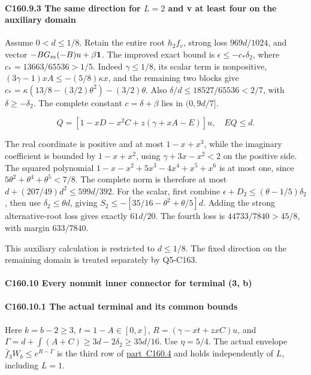 \paragraph{C160.9.3 The same direction for \(L=2\) and v at least four on the auxiliary domain}

Assume \(0<d\le1/8\). Retain the entire root \(h_2f_v\), strong loss \(969d/1024\), and vector \(-BG_m(-B)u+\beta\mathbf1\). The improved exact bound is \(\epsilon\le-c_*\delta_2\), where \(c_*=13663/65536>1/5\). Indeed \(\gamma\le1/8\), its scalar term is nonpositive, \((3\gamma-1)xA\le-(5/8)\kappa x\), and the remaining two blocks give \(c_*=\kappa(13/8-(3/2)\theta^2)-(3/2)\theta\). Also \(\delta/d\le18527/65536<2/7\), with \(\delta\ge-\delta_2\). The complete constant \(c=\delta+\beta\) lies in \((0,\allowbreak \allowbreak  9d/7]\).

\[
Q=[1-xD-x^2C+z(\gamma+xA-E)]u,\quad EQ\le d.
\]

The real coordinate is positive and at most \(1-x+x^3\), while the imaginary coefficient is bounded by \(1-x+x^2\), using \(\gamma+3x-x^2<2\) on the positive side. The squared polynomial \(1-x-x^2+5x^3-4x^4+x^5+x^6\) is at most one, since \(5\theta^2+\theta^4+\theta^5<7/8\). The complete norm is therefore at most \(d+(207/49)d^2\le599d/392\). For the scalar, first combine \(\epsilon+D_2\le(\theta-1/5)\delta_2\), then use \(\delta_2\le\theta d\), giving \(S_2\le-[35/16-\theta^2+\theta/5]d\). Adding the strong alternative-root loss gives exactly \(61d/20\). The fourth loss is \(44733/7840>45/8\), with margin \(633/7840\).

This auxiliary calculation is restricted to \(d\le1/8\). The fixed direction on the remaining domain is treated separately by Q5-C163.

\paragraph{C160.10 Every nonunit inner connector for terminal (3, b)}

\paragraph{C160.10.1 The actual terminal and its common bounds}

Here \(k=b-2\ge3\), \(t=1-A\in[0,\allowbreak \allowbreak  x]\), \(R=(\gamma-xt+zxC)u\), and \(\Gamma=d+\int(A+C)\ge3d-2\delta_2\ge35d/16\). Use \(\eta=5/4\). The actual envelope \(\bar f_3W_b\le e^{R-\Gamma}\) is the third row of \mbox{\hyperref[part:C160.4]{part C160.4}} and holds independently of \(L\), including \(L=1\).

